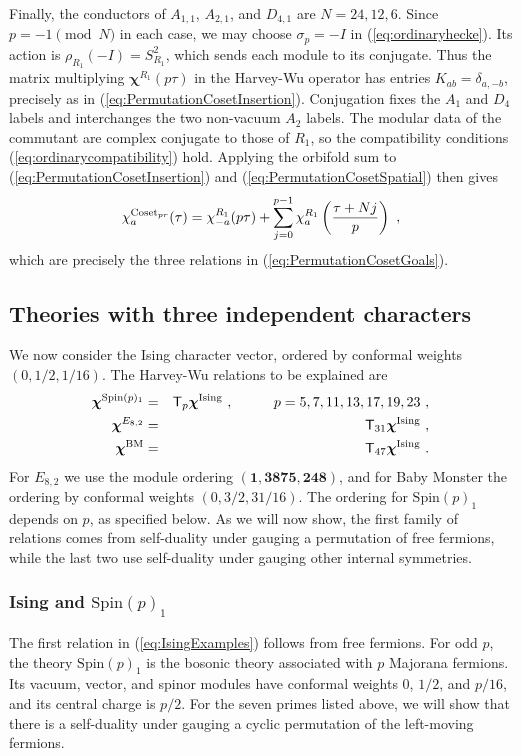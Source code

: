 \documentclass[12pt]{article}
\numberwithin{equation}{section}
\newcommand{\bea}{\begin{eqnarray}}
\newcommand{\eea}{\end{eqnarray}}
\def\no{\nonumber}
\theoremstyle{remark}
\begin{document}
Finally, the conductors of $A_{1,1}$, $A_{2,1}$, and $D_{4,1}$ are $N=24,12,6$. Since $p=-1\pmod N$ in each case, we may choose $\sigma_p=-I$ in (\ref{eq:ordinaryhecke}). Its action is $\rho_{R_1}(-I)=S_{R_1}^2$, which sends each module to its conjugate. Thus the matrix multiplying $\boldsymbol\chi^{R_1}(p\tau)$ in the Harvey-Wu operator has entries $K_{ab}=\delta_{a,-b}$, precisely as in (\ref{eq:PermutationCosetInsertion}). Conjugation fixes the $A_1$ and $D_4$ labels and interchanges the two non-vacuum $A_2$ labels. The modular data of the commutant are complex conjugate to those of $R_1$, so the compatibility conditions (\ref{eq:ordinarycompatibility}) hold. Applying the orbifold sum to (\ref{eq:PermutationCosetInsertion}) and (\ref{eq:PermutationCosetSpatial}) then gives
\bea 
\chi^{\mathrm{Coset}_{pr}}_a(\tau)=\chi^{R_1}_{-a}(p\tau)+\sum_{j=0}^{p-1}\chi^{R_1}_a\left({\tau+Nj\over p}\right)~,
\eea
which are precisely the three relations in (\ref{eq:PermutationCosetGoals}). 


\subsection{Theories with three independent characters}

We now consider the Ising character vector, ordered by conformal weights $(0,1/2,1/16)$. The Harvey-Wu relations to be explained are
\bea \label{eq:IsingExamples}
\boldsymbol{\chi}^{\mathrm{Spin}(p)_1}&=&\mathsf T_p\boldsymbol{\chi}^{\mathrm{Ising}}~,\hspace{0.4 in}p=5,7,11,13,17,19,23~,\no\\
\boldsymbol{\chi}^{E_{8,2}}&=&\mathsf T_{31}\boldsymbol{\chi}^{\mathrm{Ising}}~,\no\\
\boldsymbol{\chi}^{\mathrm{BM}}&=&\mathsf T_{47}\boldsymbol{\chi}^{\mathrm{Ising}}~.
\eea
For $E_{8,2}$ we use the module ordering $(\mathbf1,\mathbf{3875},\mathbf{248})$, and for Baby Monster the ordering by conformal weights $(0,3/2,31/16)$. The ordering for $\mathrm{Spin}(p)_1$ depends on $p$, as specified below. As we will now show, the first family of relations comes from self-duality under gauging a permutation of free fermions, while the last two use self-duality under gauging other internal symmetries.

\subsubsection{Ising and $\mathrm{Spin}(p)_1$}

The first relation in (\ref{eq:IsingExamples}) follows from free fermions. For odd $p$, the theory $\mathrm{Spin}(p)_1$ is the bosonic theory associated with $p$ Majorana fermions. Its vacuum, vector, and spinor modules have conformal weights $0$, $1/2$, and $p/16$, and its central charge is $p/2$. For the seven primes listed above, we will show that there is a self-duality under gauging a cyclic permutation of the left-moving fermions.
\end{document}
